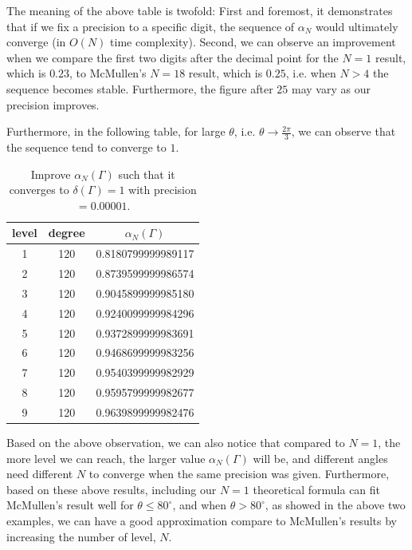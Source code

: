 \documentclass[12pt,oneside]{sfsuthesis}
\theoremstyle{plain} %
\theoremstyle{definition}  %
\theoremstyle{remark}  %
\theoremstyle{plain}
\begin{document}
{The meaning of the above table is twofold: First and foremost, it demonstrates that if we fix a precision to a specific digit, the sequence of $\alpha_N$ would ultimately converge (in $O(N)$ time complexity). Second, we can observe an improvement when we compare the first two digits after the decimal point for the $N=1$ result, which is $0.23$, to McMullen's $N=18$ result, which is $0.25$, i.e. when $N>4$ the sequence becomes stable. Furthermore, the figure after $25$ may vary as our precision improves.



Furthermore, in the following table, for large $\theta$, i.e. $\theta\to\frac{2\pi}{3}$, we can observe that the sequence tend to converge to $1$.


\begin{center}
\begin{table}[h]
\begin{tabular}{ c c c }
\hline
 level & degree & $\alpha_N(\Gamma)$ \\ \hline

 1 & 120 & 0.8180799999989117 \\
 2 & 120 & 0.8739599999986574 \\
 3 & 120 & 0.9045899999985180 \\
 4 & 120 & 0.9240099999984296 \\
 5 & 120 & 0.9372899999983691 \\
 6 & 120 & 0.9468699999983256 \\
 7 & 120 & 0.9540399999982929 \\  
 8 & 120 & 0.9595799999982677 \\  
 9 & 120 & 0.9639899999982476 \\ \hline
 
\end{tabular}
\caption{Improve $\alpha_N(\Gamma)$ such that it converges to $\delta(\Gamma)=1$ with precision$=0.00001$.}
    \label{tab:McMullen}   
\end{table}
\end{center}

Based on the above observation, we can also notice that compared to $N=1$, the more level we can reach, the larger value $\alpha_N(\Gamma)$ will be, and different angles need different $N$ to converge when the same precision was given. Furthermore, based on these above results, including our $N=1$ theoretical formula can fit McMullen's result well for $\theta\leq 80^\circ$, and when $\theta>80^\circ$, as showed in the above two examples, we can have a good approximation compare to McMullen's results by increasing the number of level, $N$. 

}
\end{document}
